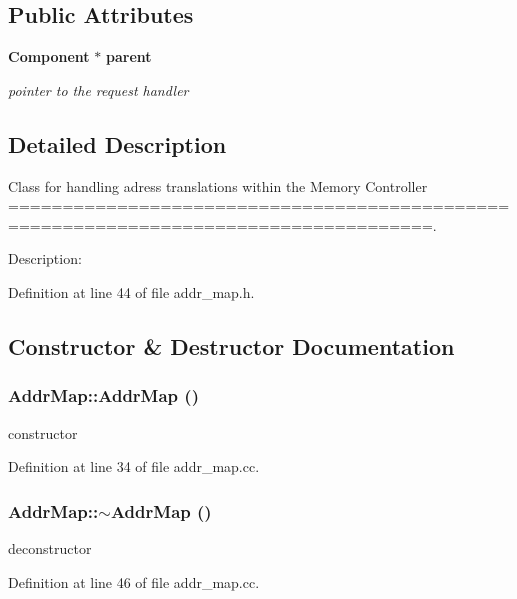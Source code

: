 \subsection*{Public Attributes}
\begin{CompactItemize}
\item 
{\bf Component} $\ast$ {\bf parent}
\begin{CompactList}\small\item\em pointer to the request handler \item\end{CompactList}\end{CompactItemize}


\subsection{Detailed Description}
Class for handling adress translations within the Memory Controller =====================================================================================. 

Description: 

Definition at line 44 of file addr\_\-map.h.

\subsection{Constructor \& Destructor Documentation}
\subsubsection[{AddrMap}]{\setlength{\rightskip}{0pt plus 5cm}AddrMap::AddrMap ()}\label{classAddrMap_444d016dee4f23d333ce23555fa9a216}


constructor 



Definition at line 34 of file addr\_\-map.cc.
\subsubsection[{$\sim$AddrMap}]{\setlength{\rightskip}{0pt plus 5cm}AddrMap::$\sim$AddrMap ()}\label{classAddrMap_160df7459c1afe77115c3f1a22759a15}


deconstructor 



Definition at line 46 of file addr\_\-map.cc.

